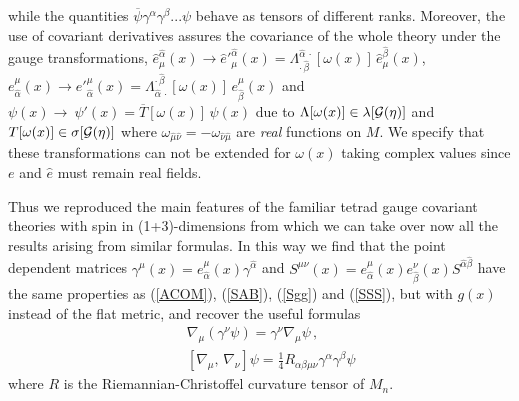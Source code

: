 \documentclass[a4paper,12pt]{article}
\begin{document}
while the quantities $\overline{\psi}\gamma^{\alpha}\gamma^{\beta}...\psi$ 
behave as tensors of different ranks. Moreover, the use of covariant 
derivatives assures the covariance of the whole theory under the  gauge 
transformations, 
$\hat e^{\hat\alpha}_{\mu}(x)\to \hat e'^{\hat\alpha}_{\mu}(x)=
\Lambda^{\hat\alpha\,\cdot}_{\cdot\,\hat\beta}[\omega(x)]
\,\hat e^{\hat\beta}_{\mu}(x)$,
$e_{\hat\alpha}^{\mu}(x)\to  {e'}_{\hat\alpha}^{\mu}(x)=
\Lambda_{\hat\alpha\,\cdot}^{\cdot\,\hat\beta}[\omega(x)]
\,e_{\hat\beta}^{\mu}(x)\label{gauge}$ and
$\psi(x)\to~\psi'(x)=\overline{T}[\omega(x)]\,\psi(x)$
due to $\Lambda[\omega(x)]\in \lambda[{\cal G}(\eta)]$ and 
$T[\omega(x)]\in \sigma[{\cal G}
(\eta)]$ where $\omega_{\hat\mu\hat\nu}=-\omega_{\hat\nu\hat\mu} $ are 
{\em real} functions on $M$. 
We specify that these transformations can not be extended for  $\omega(x)$ 
taking complex values since  $e$ and $\hat e$ must  remain real fields. 

Thus we  reproduced  the main features of the familiar tetrad gauge 
covariant theories with spin in (1+3)-dimensions from which we can take over 
now all the results arising from similar formulas. In this way we find that 
the 
point dependent matrices 
$\gamma^{\mu}(x)=e^{\mu}_{\hat\alpha}(x)\gamma^{\hat\alpha}$ and
$S^{\mu\nu}(x)=e^{\mu}_{\hat\alpha}(x)e^{\nu}_{\hat\beta}(x)
S^{\hat\alpha\hat\beta}$
have the same properties as (\ref{ACOM}), (\ref{SAB}), (\ref{Sgg}) and 
(\ref{SSS}), but 
with $g(x)$ instead of the flat metric, and  recover the 
useful formulas 
\begin{eqnarray}
&&\nabla_{\mu}(\gamma^{\nu}\psi)=\gamma^{\nu}\nabla_{\mu}\psi\,, 
\label{Nabg}\\
&&[\nabla_{\mu},\,\nabla_{\nu}]\psi=
\textstyle{\frac{1}{4}}R_{\alpha\beta \mu\nu}
\gamma^{\alpha}\gamma^{\beta}\psi
\end{eqnarray}
where $R$ is the Riemannian-Christoffel curvature tensor of $M_n$. 
\end{document}
